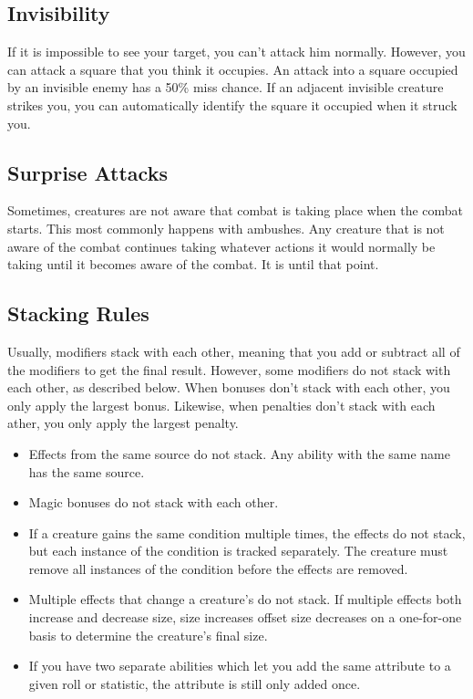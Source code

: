     \subsection{Invisibility}\label{Invisibility}
        If it is impossible to see your target, you can't attack him normally. However, you can attack a square that you think it occupies. An attack into a square occupied by an invisible enemy has a 50\% miss chance. If an adjacent invisible creature strikes you, you can automatically identify the square it occupied when it struck you.

    \subsection{Surprise Attacks}\label{Surprise Attacks}
        Sometimes, creatures are not aware that combat is taking place when the combat starts. This most commonly happens with ambushes. Any creature that is not aware of the combat continues taking whatever actions it would normally be taking until it becomes aware of the combat. It is \unaware until that point.

    \subsection{Stacking Rules}\label{Stacking Rules}
        Usually, modifiers stack with each other, meaning that you add or subtract all of the modifiers to get the final result.
        However, some modifiers do not stack with each other, as described below.
        When bonuses don't stack with each other, you only apply the largest bonus.
        Likewise, when penalties don't stack with each ather, you only apply the largest penalty.


        \begin{itemize}
            \item Effects from the same source do not stack. Any ability with the same name has the same source.
            \item Magic bonuses do not stack with each other.
            \item If a creature gains the same condition multiple times, the effects do not stack, but each instance of the condition is tracked separately.
                The creature must remove all instances of the condition before the effects are removed.
            \item Multiple effects that change a creature's  do not stack.
                If multiple effects both increase and decrease size, size increases offset size decreases on a one-for-one basis to determine the creature's final size.
            \item If you have two separate abilities which let you add the same attribute to a given roll or statistic, the attribute is still only added once.
        \end{itemize}

